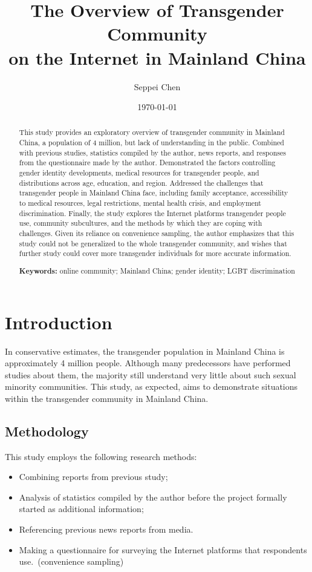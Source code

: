 \documentclass{article}
\title{The Overview of Transgender Community\\on the Internet in Mainland China}
\author{Seppei Chen}
\date{\today}
\begin{document}
	\maketitle
	
	\begin{abstract}
		This study provides an exploratory overview of transgender community in Mainland China, a population of 4 million, but lack of understanding in the public. Combined with previous studies, statistics compiled by the author, news reports, and responses from the questionnaire made by the author. Demonstrated the factors controlling gender identity developments, medical resources for transgender people, and distributions across age, education, and region. Addressed the challenges that transgender people in Mainland China face, including family acceptance, accessibility to medical resources, legal restrictions, mental health crisis, and employment discrimination. Finally, the study explores the Internet platforms transgender people use, community subcultures, and the methods by which they are coping with challenges. Given its reliance on convenience sampling, the author emphasizes that this study could not be generalized to the whole transgender community, and wishes that further study could cover more transgender individuals for more accurate information.

        \textbf{Keywords:} online community; Mainland China; gender identity; LGBT discrimination
	\end{abstract}

	\section{Introduction}
	In conservative estimates, the transgender population in Mainland China is approximately 4 million people. Although many predecessors have performed studies about them, the majority still understand very little about such sexual minority communities. This study, as expected, aims to demonstrate situations within the transgender community in Mainland China. 

		\subsection{Methodology}
		This study employs the following research methods:
		\begin{itemize}
			\item Combining reports from previous study;
			\item Analysis of statistics compiled by the author before the project formally started as additional information;
			\item Referencing previous news reports from media.
			\item Making a questionnaire for surveying the Internet platforms that respondents use.\ (convenience sampling)
		\end{itemize}
\end{document}
